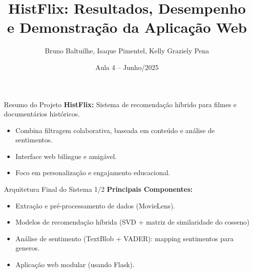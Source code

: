 \documentclass{beamer}
\title[HistFlix: Resultados e Web App]{HistFlix: Resultados, Desempenho e Demonstração da Aplicação Web}
\author{Bruno Baltuilhe, Isaque Pimentel, Kelly Graziely Pena}
\institute{Universidade Presbiteriana Mackenzie}
\date{Aula 4 -- Junho/2025}
\begin{document}
\begin{frame}
    \titlepage
\end{frame}

\begin{frame}{Resumo do Projeto}
    \textbf{HistFlix:} Sistema de recomendação híbrido para filmes e documentários históricos.
    \vspace{0.5cm}
    \begin{itemize}
        \item Combina filtragem colaborativa, baseada em conteúdo e análise de sentimentos.
        \item Interface web bilíngue e amigável.
        \item Foco em personalização e engajamento educacional.
    \end{itemize}
\end{frame}

\begin{frame}{Arquitetura Final do Sistema 1/2}
    \textbf{Principais Componentes:}
    \begin{itemize}
        \item Extração e pré-processamento de dados (MovieLens).
        \item Modelos de recomendação híbrida (SVD + matriz de similaridade do cosseno) 
        \item Análise de sentimento (TextBlob + VADER): mapping sentimentos para generos.
        \item Aplicação web modular (usando Flask).
    \end{itemize}
\end{frame}
\end{document}
